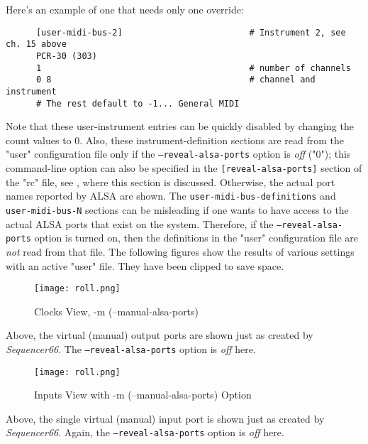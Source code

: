   Here's an example of one that needs only one override:

   \begin{verbatim}
      [user-midi-bus-2]                         # Instrument 2, see ch. 15 above
      PCR-30 (303)
      1                                         # number of channels
      0 8                                       # channel and instrument
      # The rest default to -1... General MIDI
   \end{verbatim}

   Note that these user-instrument entries can be quickly disabled by changing
   the count values to 0.
   Also, these instrument-definition
   sections are read from the "user" configuration file only if
   the \texttt{--reveal-alsa-ports} option is \textsl{off} ("0");
   this command-line option can also be specified in the
   \texttt{[reveal-alsa-ports]} section of the "rc" file,
   see , where this section is
   discussed.
   Otherwise, the actual port names reported by ALSA are shown.
   The \texttt{user-midi-bus-definitions} and \texttt{user-midi-bus-N} sections
   can be misleading if one wants to have access to the
   actual ALSA ports that exist on the system.
   Therefore, if the \texttt{--reveal-alsa-ports} option is turned on, then the
   definitions in the "user" configuration file are \textsl{not} read from that
   file.  The following figures show the results of various settings with an
   active "user" file.  They have been clipped to save space.

\begin{figure}[H]
   \centering 
   \texttt{[image: roll.png]}
   \caption{Clocks View, -m (--manual-alsa-ports)}
   \label{fig:seq66_clock_m}
\end{figure}

   Above, the virtual (manual) output ports are shown just as created by
   \textsl{Sequencer66}.
   The \texttt{--reveal-alsa-ports} option is \textsl{off} here.

\begin{figure}[H]
   \centering 
   \texttt{[image: roll.png]}
   \caption{Inputs View with -m (--manual-alsa-ports) Option}
   \label{fig:seq66_input_m}
\end{figure}

   Above, the single virtual (manual) input port is shown just as created by
   \textsl{Sequencer66}.
   Again, the \texttt{--reveal-alsa-ports} option is \textsl{off} here.

